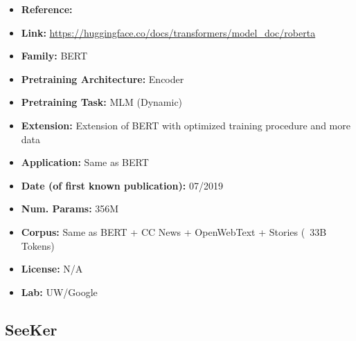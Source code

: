 \documentclass{article}
\begin{document}
            \begin{itemize}
                \item \textbf{Reference:} 
                \item \textbf{Link:} \url{https://huggingface.co/docs/transformers/model_doc/roberta}
                \item \textbf{Family:} BERT 
                \item \textbf{Pretraining Architecture:} Encoder
                \item \textbf{Pretraining Task:} MLM (Dynamic)
                \item \textbf{Extension:} Extension of BERT with optimized training procedure and more data  
                \item \textbf{Application:} Same as BERT
                \item \textbf{Date (of first known publication):} 07/2019
                \item \textbf{Num. Params:} 356M
                \item \textbf{Corpus:} Same as BERT + CC News + OpenWebText + Stories (~33B Tokens)
                \item \textbf{License:} N/A
                \item \textbf{Lab:} UW/Google
            \end{itemize}
            
\subsection{SeeKer}
\end{document}
